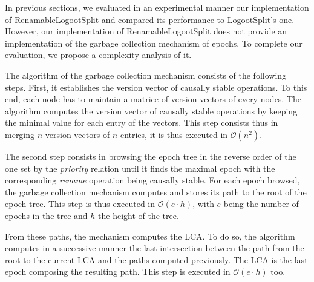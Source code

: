 \documentclass[10pt,journal,compsoc]{IEEEtran}
\newcommand{\bigO}[1]{$\mathcal{O}(#1)$}
\begin{document}
In previous sections, we evaluated in an experimental manner our implementation of RenamableLogootSplit and compared its performance to LogootSplit's one.
However, our implementation of RenamableLogootSplit does not provide an implementation of the garbage collection mechanism of epochs.
To complete our evaluation, we propose a complexity analysis of it.

The algorithm of the garbage collection mechanism consists of the following steps.
First, it establishes the version vector of causally stable operations.
To this end, each node has to maintain a matrice of version vectors of every nodes.
The algorithm computes the version vector of causally stable operations by keeping the minimal value for each entry of the vectors.
This step consists thus in merging $n$ version vectors of $n$ entries, it is thus executed in \bigO{n^2}.

The second step consists in browsing the epoch tree in the reverse order of the one set by the \emph{priority} relation until it finds the maximal epoch with the corresponding \emph{rename} operation being causally stable.
For each epoch browsed, the garbage collection mechanism computes and stores its path to the root of the epoch tree.
This step is thus executed in \bigO{e \cdot h}, with $e$ being the number of epochs in the tree and $h$ the height of the tree.

From these paths, the mechanism computes the \ac{LCA}.
To do so, the algorithm computes in a successive manner the last intersection between the path from the root to the current \ac{LCA} and the paths computed previously.
The \ac{LCA} is the last epoch composing the resulting path.
This step is executed in \bigO{e \cdot h} too.
\end{document}
